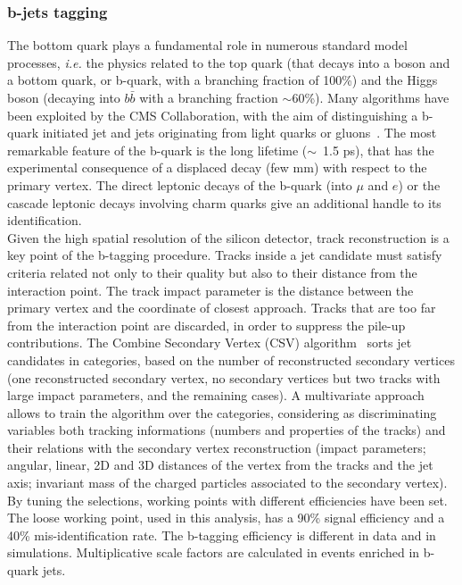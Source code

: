 \subsubsection{b-jets tagging}
\indent The bottom quark plays a fundamental role in numerous standard model processes, \textit{i.e.} the physics related to the top quark (that decays into a \W boson and a bottom quark, or b-quark, with a branching fraction of 100\%) and the Higgs boson (decaying into $b \bar{b}$ with a branching fraction $\sim$60\%). Many algorithms have been exploited by the CMS Collaboration, with the aim of distinguishing a b-quark initiated jet and jets originating from light quarks or gluons~\cite{CMS-PAS-BTV-15-001}. The most remarkable feature of the b-quark is the long lifetime ($\sim$~1.5 ps), that has the experimental consequence of a displaced decay (few mm) with respect to the primary vertex. The direct leptonic decays of the b-quark (into $\mu$ and $e$) or the cascade leptonic decays involving charm quarks give an additional handle to its identification.\\
Given the high spatial resolution of the silicon detector, track reconstruction is a key point of the b-tagging procedure. Tracks inside a jet candidate must satisfy criteria related not only to their quality but also to their distance from the interaction point. The track impact parameter is the distance between the primary vertex and the coordinate of closest approach. Tracks that are too far from the interaction point are discarded, in order to suppress the pile-up contributions. The Combine Secondary Vertex (CSV) algorithm~\cite{Chatrchyan:2012jua} sorts jet candidates in categories, based on the number of reconstructed secondary vertices (one reconstructed secondary vertex, no secondary vertices but two tracks with large impact parameters, and the remaining cases). A multivariate approach allows to train the algorithm over the categories, considering as discriminating variables both tracking informations (numbers and properties of the tracks) and their relations with the secondary vertex reconstruction (impact parameters; angular, linear, 2D and 3D distances of the vertex from the tracks and the jet axis; invariant mass of the charged particles associated to the secondary vertex).\\
By tuning the selections, working points with different efficiencies have been set. The loose working point, used in this analysis, has a 90\% signal efficiency and a 40\% mis-identification rate. The b-tagging efficiency is different in data and in simulations. Multiplicative scale factors are calculated in events enriched in b-quark jets.\\

